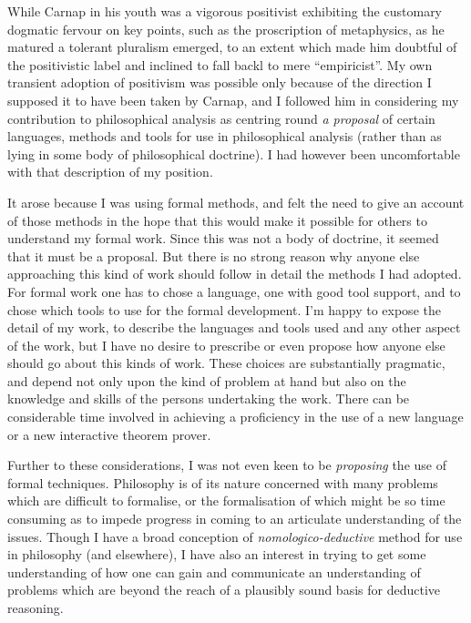 While Carnap in his youth was a vigorous positivist exhibiting the customary dogmatic fervour on key points, such as the proscription of metaphysics, as he matured a tolerant pluralism emerged, to an extent which made him doubtful of the positivistic label and inclined to fall backl to mere ``empiricist''.
My own transient adoption of positivism was possible only because of the direction I supposed it to have been taken by Carnap, and I followed him in considering my contribution to philosophical analysis as centring round {\it a proposal} of certain languages, methods and tools for use in philosophical analysis (rather than as lying in some body of philosophical doctrine).
I had however been uncomfortable with that description of my position.

It arose because I was using formal methods, and felt the need to give an account of those methods in the hope that this would make it possible for others to understand my formal work.
Since this was not a body of doctrine, it seemed that it must be a proposal.
But there is no strong reason why anyone else approaching this kind of work should follow in detail the methods I had adopted.
For formal work one has to chose a language, one with good tool support, and to chose which tools to use for the formal development.
I'm happy to expose the detail of my work, to describe the languages and tools used and any other aspect of the work, but I have no desire to prescribe or even propose how anyone else should go about this kinds of work.
These choices are substantially pragmatic, and depend not only upon the kind of problem at hand but also on the knowledge and skills of the persons undertaking the work.
There can be considerable time involved in achieving a proficiency in the use of a new language or a new interactive theorem prover.

Further to these considerations, I was not even keen to be \emph{proposing} the use of formal techniques.
Philosophy is of its nature concerned with many problems which are difficult to formalise, or the formalisation of which might be so time consuming as to impede progress in coming to an articulate understanding of the issues.
Though I have a broad conception of \emph{nomologico-deductive} method for use in philosophy (and elsewhere), I have also an interest in trying to get some understanding of how one can gain and communicate an understanding of problems which are beyond the reach of a plausibly sound basis for deductive reasoning.

